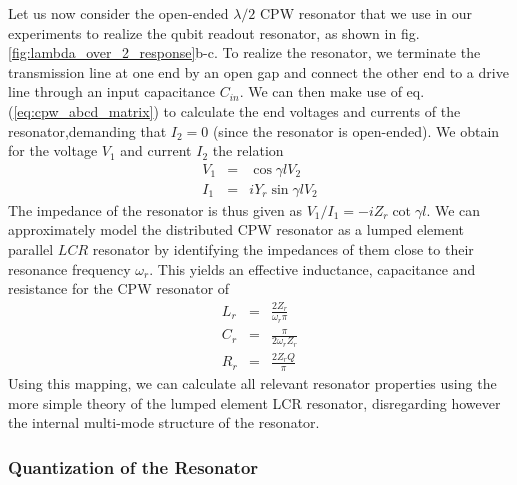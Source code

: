 Let us now consider the open-ended $\lambda / 2$ CPW resonator that we use in our experiments to realize the qubit readout resonator, as shown in fig. \ref{fig:lambda_over_2_response}b-c. To realize the resonator, we terminate the transmission line at one end by an open gap and connect the other end to a drive line through an input capacitance $C_{in}$. We can then make use of eq. (\ref{eq:cpw_abcd_matrix}) to calculate the end voltages and currents of the resonator,demanding that $I_2=0$ (since the resonator is open-ended). We obtain for the voltage $V_1$ and current $I_2$ the relation
%
\begin{eqnarray}
V_1 & = & \cos{\gamma l} V_2 \\
I_1 & = & i Y_r \sin{\gamma l} V_2
\end{eqnarray}
%
The impedance of the resonator is thus given as $V_1/I_1 = -i Z_r \cot{\gamma l}$. We can approximately model the distributed CPW resonator as a lumped element parallel $LCR$ resonator by identifying the impedances of them close to their resonance frequency $\omega_r$. This yields an effective inductance, capacitance and resistance for the CPW resonator of
%
\begin{eqnarray}
L_{r} & = & \frac{2 Z_r}{\omega_r \pi} \\
C_{r} & = & \frac{\pi}{2\omega_r Z_r} \\
R_{r} & = & \frac{2 Z_r Q}{\pi}
\end{eqnarray}
%
Using this mapping, we can calculate all relevant resonator properties using the more simple theory of the lumped element LCR resonator, disregarding however the internal multi-mode structure of the resonator.

\subsubsection{Quantization of the Resonator}

